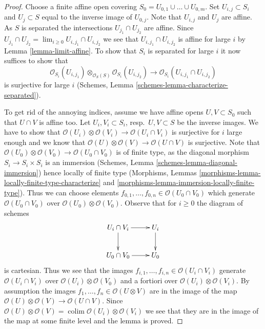 \documentclass{stacks-project}
\theoremstyle{plain}
\theoremstyle{definition}
\theoremstyle{remark}
\numberwithin{equation}{subsection}
\def\lim{\mathop{\mathrm{lim}}\nolimits}
\def\colim{\mathop{\mathrm{colim}}\nolimits}
\begin{document}
\begin{proof}
Choose a finite affine open covering
$S_0 = U_{0, 1} \cup \ldots \cup U_{0, m}$.
Set $U_{i, j} \subset S_i$ and $U_j \subset S$
equal to the inverse image of $U_{0, j}$.
Note that $U_{i, j}$ and $U_j$ are affine. As $S$ is separated
the intersections $U_{j_1} \cap U_{j_2}$ are affine. Since
$U_{j_1} \cap U_{j_2} = \lim_{i \geq 0} U_{i, j_1} \cap U_{i, j_2}$
we see that $U_{i, j_1} \cap U_{i, j_2}$ is affine for large $i$
by Lemma \ref{lemma-limit-affine}. To show that $S_i$ is separated
for large $i$ it now suffices to show that
$$
\mathcal{O}_{S_i}(U_{i, j_1})
\otimes_{\mathcal{O}_S(S)}
\mathcal{O}_{S_i}(U_{i, j_2})
\longrightarrow
\mathcal{O}_{S_i}(U_{i, j_1} \cap U_{i, j_2})
$$
is surjective for large $i$
(Schemes, Lemma \ref{schemes-lemma-characterize-separated}).

\medskip\noindent
To get rid of the annoying indices, assume we have affine opens
$U, V \subset S_0$ such that $U \cap V$ is affine too.
Let $U_i, V_i \subset S_i$, resp.\ $U, V \subset S$ be the inverse images.
We have to show that
$\mathcal{O}(U_i) \otimes \mathcal{O}(V_i) \to
\mathcal{O}(U_i \cap V_i)$
is surjective for $i$ large enough and we know that
$\mathcal{O}(U) \otimes \mathcal{O}(V) \to \mathcal{O}(U \cap V)$
is surjective. Note that
$\mathcal{O}(U_0) \otimes \mathcal{O}(V_0) \to
\mathcal{O}(U_0 \cap V_0)$
is of finite type, as the diagonal morphism $S_i \to S_i \times S_i$
is an immersion (Schemes, Lemma \ref{schemes-lemma-diagonal-immersion})
hence locally of finite type
(Morphisms, Lemmas \ref{morphisms-lemma-locally-finite-type-characterize} and
\ref{morphisms-lemma-immersion-locally-finite-type}).
Thus we can choose elements
$f_{0, 1}, \ldots, f_{0, n} \in \mathcal{O}(U_0 \cap V_0)$
which generate $\mathcal{O}(U_0 \cap V_0)$ over
$\mathcal{O}(U_0) \otimes \mathcal{O}(V_0)$.
Observe that for $i \geq 0$ the diagram of schemes
$$
\xymatrix{
U_i \cap V_i \ar[r] \ar[d] & U_i \ar[d] \\
U_0 \cap V_0 \ar[r] & U_0
}
$$
is cartesian. Thus we see that the images
$f_{i, 1}, \ldots, f_{i, n} \in \mathcal{O}(U_i \cap V_i)$
generate $\mathcal{O}(U_i \cap V_i)$ over
$\mathcal{O}(U_i) \otimes \mathcal{O}(V_0)$
and a fortiori over
$\mathcal{O}(U_i) \otimes \mathcal{O}(V_i)$.
By assumption the images $f_1, \ldots, f_n \in \mathcal{O}(U \otimes V)$
are in the image of the map
$\mathcal{O}(U) \otimes \mathcal{O}(V) \to \mathcal{O}(U \cap V)$.
Since
$\mathcal{O}(U) \otimes \mathcal{O}(V) =
\colim \mathcal{O}(U_i) \otimes \mathcal{O}(V_i)$
we see that they are in the image of the map at some finite level
and the lemma is proved.
\end{proof}
\end{document}
